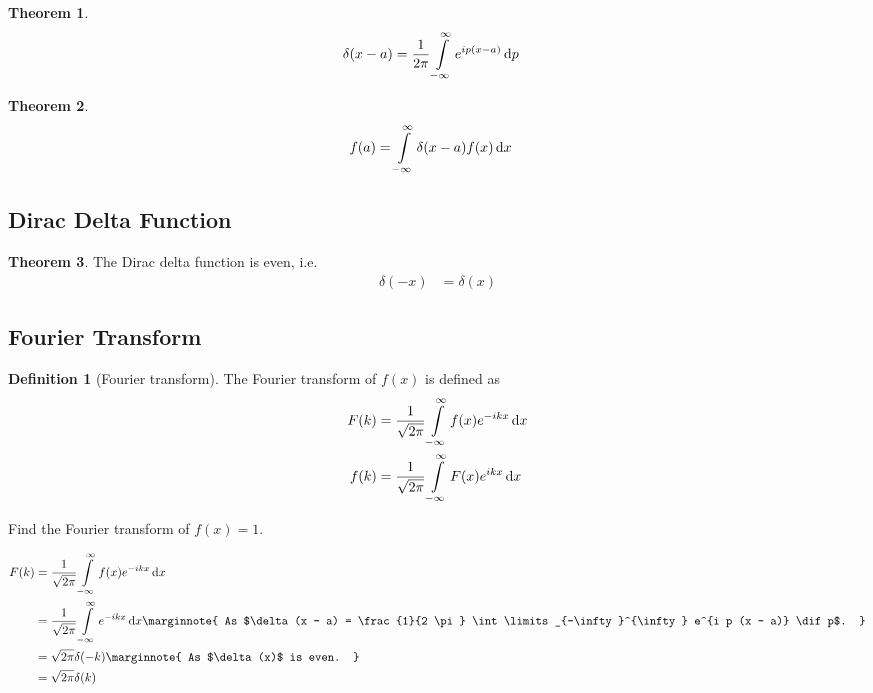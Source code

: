 \documentclass[titlepage, fleqn, a4paper, 12pt, twoside]{article}
\theoremstyle{definition}
\newtheorem{definition}{Definition}
\theoremstyle{theorem}
\newtheorem{theorem}{Theorem}
\let\Oldsubsection\subsection
\renewcommand{\subsection}{\FloatBarrier\Oldsubsection}
\begin{document}
\begin{theorem}
	\begin{align*}
		\delta(x - a) &= \frac{1}{2 \pi} \int\limits_{-\infty}^{\infty} e^{i p (x - a)} \dif p
	\end{align*}
\end{theorem}

\begin{theorem}
	\begin{align*}
		f(a) &= \int\limits_{-\infty}^{\infty} \delta(x - a) f(x) \dif x
	\end{align*}
\end{theorem}

\subsection{Dirac Delta Function}

\begin{theorem}
	The Dirac delta function is even, i.e.
	\begin{align*}
		\delta(-x) &= \delta(x)
	\end{align*}
\end{theorem}

\subsection{Fourier Transform}

\begin{definition}[Fourier transform]
	The Fourier transform of $f(x)$ is defined as
	\begin{align*}
		F(k) &= \frac{1}{\sqrt{2 \pi}} \int\limits_{-\infty}^{\infty} f(x) e^{-i k x} \dif x\\
		f(k) &= \frac{1}{\sqrt{2 \pi}} \int\limits_{-\infty}^{\infty} F(x) e^{i k x} \dif x
	\end{align*}
\end{definition}

\begin{question}
	Find the Fourier transform of $f(x) = 1$.
\end{question}

\begin{solution}
	\begin{align*}
		F(k) &= \frac{1}{\sqrt{2 \pi}} \int\limits_{-\infty}^{\infty} f(x) e^{-i k x} \dif x\\
		&= \frac{1}{\sqrt{2 \pi}} \int\limits_{-\infty}^{\infty} e^{-i k x} \dif x
		\marginnote
		{
			As $\delta(x - a) = \frac{1}{2 \pi} \int\limits_{-\infty}^{\infty} e^{i p (x - a)} \dif p$.
		}\\
		&= \sqrt{2 \pi} \delta(-k)
		\marginnote
		{
			As $\delta(x)$ is even.
		}\\
		&= \sqrt{2 \pi} \delta(k)
	\end{align*}
\end{solution}
\end{document}
